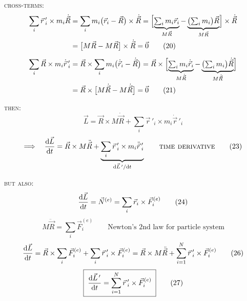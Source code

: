\documentclass[11pt]{article}
\begin{document}
\textsc{cross-terms:}
\begin{align*}
\sum_i \vec{r}\,'_i \times m_i\dot{\vec{R}}
&= \sum_i m_i\bigl(\vec{r}_i-\vec{R}\bigr)\times\dot{\vec{R}}
= \Bigl[\underbrace{\textstyle\sum_i m_i\vec{r}_i}_{M\vec{R}}
- \underbrace{\bigl(\textstyle\sum_i m_i\bigr)\vec{R}}_{M\vec{R}}\Bigr]\times\dot{\vec{R}}\\
&= \bigl[M\vec{R}-M\vec{R}\bigr]\times\dot{\vec{R}} = \vec{0} \tag{20}\label{eq:A20}\\[6pt]
\sum_i \vec{R}\times m_i\dot{\vec{r}}\,'_i
&= \vec{R}\times\sum_i m_i\bigl(\dot{\vec{r}}_i-\dot{\vec{R}}\bigr)
= \vec{R}\times\Bigl[\underbrace{\textstyle\sum_i m_i\dot{\vec{r}}_i}_{M\dot{\vec{R}}}
- \underbrace{\bigl(\textstyle\sum_i m_i\bigr)\dot{\vec{R}}}_{M\dot{\vec{R}}}\Bigr]\\
&= \vec{R}\times\bigl[M\dot{\vec{R}}-M\dot{\vec{R}}\bigr] = \vec{0} \tag{21}\label{eq:A21}
\end{align*}

\textsc{then:}
\begin{equation*}
\boxed{\;\vec{L} = \vec{R}\times M\dot{\vec{R}} + \sum_i \vec{r}\,'_i \times m_i \dot{\vec{r}}\,'_i\;}
\tag{22}\label{eq:A22}
\end{equation*}
\begin{equation*}
\Longrightarrow\quad
\frac{\mathrm{d}\vec{L}}{\mathrm{d} t} = \vec{R}\times M\ddot{\vec{R}}
+ \underbrace{\sum_i \vec{r}\,'_i \times m_i \ddot{\vec{r}}\,'_i}_{\mathrm{d}\vec{L}\,'/\mathrm{d} t}
\qquad \text{\textsc{time derivative}}
\tag{23}\label{eq:A23}
\end{equation*}

\textsc{but also:}
\begin{equation*}
\frac{\mathrm{d}\vec{L}}{\mathrm{d} t} = \vec{N}^{(e)} = \sum_i \vec{r}_i\times\vec{F}^{(e)}_i
\tag{24}\label{eq:A24}
\end{equation*}
\begin{equation*}
M\ddot{\vec{R}} = \sum_i \vec{F}^{(e)}_i \qquad
\text{Newton's 2nd law for particle system}
\tag{25}\label{eq:A25}
\end{equation*}
\begin{equation*}
\frac{\mathrm{d}\vec{L}}{\mathrm{d} t} = \vec{R}\times\sum_i \vec{F}^{(e)}_i + \sum_i \vec{r}\,'_i\times\vec{F}^{(e)}_i
= \vec{R}\times M\ddot{\vec{R}} + \sum_{i=1}^{N}\vec{r}\,'_i\times\vec{F}^{(e)}_i
\tag{26}\label{eq:A26}
\end{equation*}
\begin{equation*}
\boxed{\;\frac{\mathrm{d}\vec{L}\,'}{\mathrm{d} t} = \sum_{i=1}^{N}\vec{r}\,'_i\times\vec{F}^{(e)}_i\;}
\tag{27}\label{eq:A27}
\end{equation*}
\end{document}
